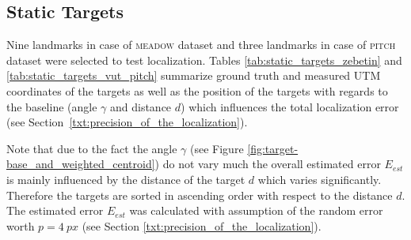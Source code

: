 \subsection{Static Targets}

Nine landmarks in case of \textsc{meadow} dataset and three landmarks in case of \textsc{pitch} dataset were selected to test localization. Tables \ref{tab:static_targets_zebetin} and \ref{tab:static_targets_vut_pitch} summarize ground truth and measured UTM coordinates of the targets as well as the position of the targets with regards to the baseline (angle $\gamma$ and distance $d$) which influences the total localization error (see Section~\ref{txt:precision_of_the_localization}). 

Note that due to the fact the angle $\gamma$ (see Figure \ref{fig:target-base_and_weighted_centroid}) do not vary much the overall estimated error $E_{est}$ is mainly influenced by the distance of the target $d$ which varies significantly. Therefore the targets are sorted in ascending order with respect to the distance $d$. The estimated error $E_{est}$ was calculated with assumption of the random error worth $p = 4~px$ (see Section \ref{txt:precision_of_the_localization}). 

